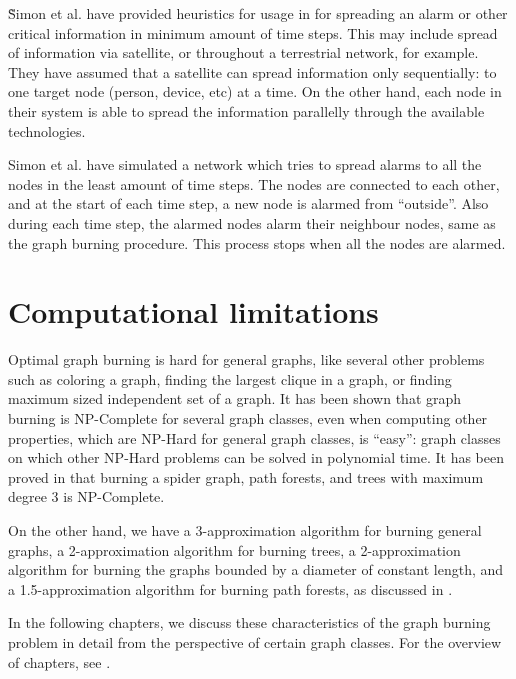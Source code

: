 {\~S}imon et al. \cite{Simon2019} have provided heuristics for usage in for spreading an alarm or other critical information in minimum amount of time steps. This may include spread of information via satellite, or throughout a terrestrial network, for example.
They have assumed that a satellite can spread information only sequentially: to one target node (person, device, etc) at a time. On the other hand, each node in their system is able to spread the information parallelly through the available technologies.

Simon et al. \cite{Simon2019a} have simulated a network which tries to spread alarms to all the nodes in the least amount of time steps. The nodes are connected to each other, and at the start of each time step, a new node is alarmed from ``outside''. Also during each time step, the alarmed nodes alarm their neighbour nodes, same as the graph burning procedure. This process stops when all the nodes are alarmed.

\section{Computational limitations}

Optimal graph burning is hard \cite{Bessy2017} for general graphs, like several other problems such as coloring a graph, finding the largest clique in a graph, or finding maximum sized independent set of a graph. It has been shown that graph burning is NP-Complete for several graph classes, even when computing other properties, which are NP-Hard for general graph classes, is ``easy'': graph classes on which other NP-Hard problems can be solved in polynomial time. It has been proved in \cite{Bessy2017} that burning a spider graph, path forests, and trees with maximum degree 3 is NP-Complete.

On the other hand, we have a 3-approximation algorithm for burning general graphs, a 2-approximation algorithm for burning trees, a 2-approximation algorithm for burning the graphs bounded by a diameter of constant length, and a 1.5-approximation algorithm for burning path forests, as discussed in .

In the following chapters, we discuss these characteristics of the graph burning problem in detail from the perspective of certain graph classes. For the overview of chapters, see .

% 
% 